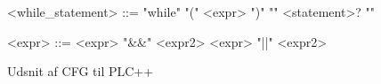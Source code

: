 \begin{Grammar}
 \begin{grammar}
 
 <while\_statement> ::= "while" "(" <expr> ")" "{" <statement>? "}"
 
 <expr> ::= <expr> "&&" <expr2>
 \alt <expr> "||" <expr2>
  
  
 \end{grammar}
 \caption{Udsnit af CFG til PLC++}\label{gra:udsnit}
\end{Grammar}